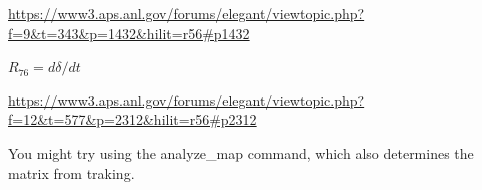 \documentclass[12pt]{scrreprt}%
\newcommand{\qed}{\newline \mbox{~} \hfill$\square$}
\newtheorem{deff}{Definition}[chapter]
\newtheorem{satz}[deff]{Satz}
\newtheorem{theorem}[deff]{Theorem}
\newtheorem{lemma}[deff]{Lemma}
\newtheorem{proposition}[deff]{Proposition}
\newtheorem{korollar}[deff]{Korollar}
\newtheorem{bem}[deff]{Bemerkung}
\newtheorem{bsp}[deff]{Beispiel}
\newtheorem{anm}[deff]{Anmerkung}
\newtheorem{folg}[deff]{Folgerung}
\newenvironment{beweis}[1][Beweis]{\begin{trivlist}    %
\item[\hskip \labelsep {\bfseries #1}]}{\end{trivlist}}
\newenvironment{wdh}[1][Wiederholung]{\begin{trivlist}    %
\item[\hskip \labelsep {\bfseries #1}]}{\end{trivlist}}
\begin{document}
\url{https://www3.aps.anl.gov/forums/elegant/viewtopic.php?f=9&t=343&p=1432&hilit=r56#p1432}

$R_{76}=d\delta/dt$

\url{https://www3.aps.anl.gov/forums/elegant/viewtopic.php?f=12&t=577&p=2312&hilit=r56#p2312}


You might try using the analyze\_map command, which also determines the matrix from traking.


 







%
%
%
%
%
%
%
%
%
%
%
%
%
%
%
%
%
%
%
%
%
%
\end{document}
